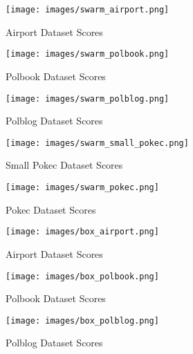 \documentclass[sigconf,authordraft]{acmart}
\begin{document}
\begin{figure}[H]

  \centering
  \texttt{[image: images/swarm\_airport.png]}
  \caption{Airport Dataset Scores}
\end{figure}
\begin{figure}[H]

  \centering
  \texttt{[image: images/swarm\_polbook.png]}
  \caption{Polbook Dataset Scores}
\end{figure}

\begin{figure}[H]

  \centering
  \texttt{[image: images/swarm\_polblog.png]}
  \caption{Polblog Dataset Scores}
\end{figure}

\begin{figure}[H]
  \centering
  \texttt{[image: images/swarm\_small\_pokec.png]}
  \caption{Small Pokec Dataset Scores}
\end{figure}
\begin{figure}[H]
  \centering
  \texttt{[image: images/swarm\_pokec.png]}
  \caption{Pokec Dataset Scores}
\end{figure}

\begin{figure}[H]

  \centering
  \texttt{[image: images/box\_airport.png]}
  \caption{Airport Dataset Scores}
\end{figure}

\begin{figure}[H]

  \centering
  \texttt{[image: images/box\_polbook.png]}
  \caption{Polbook Dataset Scores}
\end{figure}
\begin{figure}[H]

  \centering
  \texttt{[image: images/box\_polblog.png]}
  \caption{Polblog Dataset Scores}
\end{figure}
\end{document}
